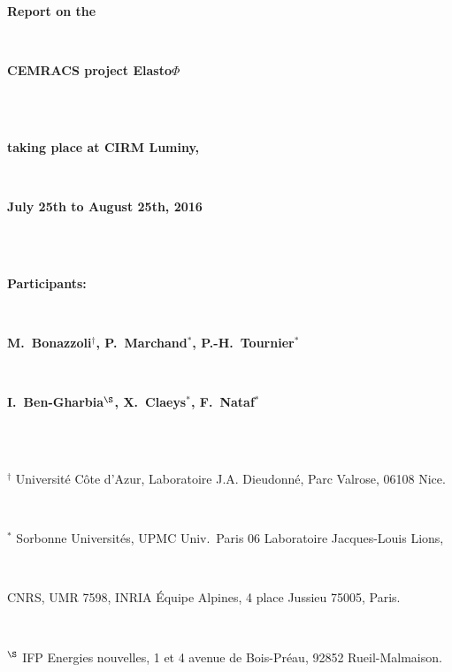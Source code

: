 

\thispagestyle{empty}

\centerline{\textbf{\huge Report on the}}
\quad\\[5pt]
\centerline{\textbf{\huge CEMRACS project Elasto$\Phi$}}
\quad\\[5pt]
\vspace{1cm}
\quad\\
\centerline{\textbf{\Large taking place at CIRM Luminy,}}\quad\\[5pt]
\centerline{\textbf{\Large July 25th to August 25th, 2016}}\quad\\[5pt]
\vspace{1cm}
\quad\\
\centerline{\textbf{\Large Participants:}}\quad\\[15pt]
\centerline{\textbf{\Large M.~Bonazzoli$^{\dagger}$, P.~Marchand$^{*}$, P.-H.~Tournier$^{*}$}}\quad\\[5pt]
\centerline{\textbf{\Large I.~Ben-Gharbia$^{\S}$, X.~Claeys$^{*}$, F.~Nataf$^{*}$}}\quad\\[5pt]
\vspace{0.25cm}\quad\\
\centerline{$^{\dagger}$ Universit\'e C\^ote d'Azur, Laboratoire J.A. Dieudonn\'e, Parc Valrose, 06108 Nice.}\,\\
\centerline{$^{*}$ Sorbonne Universit\'es, UPMC Univ.~Paris 06 Laboratoire Jacques-Louis Lions,}\,\\
\centerline{CNRS, UMR 7598, INRIA \'Equipe Alpines, 4 place Jussieu 75005, Paris.}\,\\
\centerline{$^{\S}$ IFP Energies nouvelles, 1 et 4 avenue de Bois-Pr\'eau, 92852 Rueil-Malmaison.}



